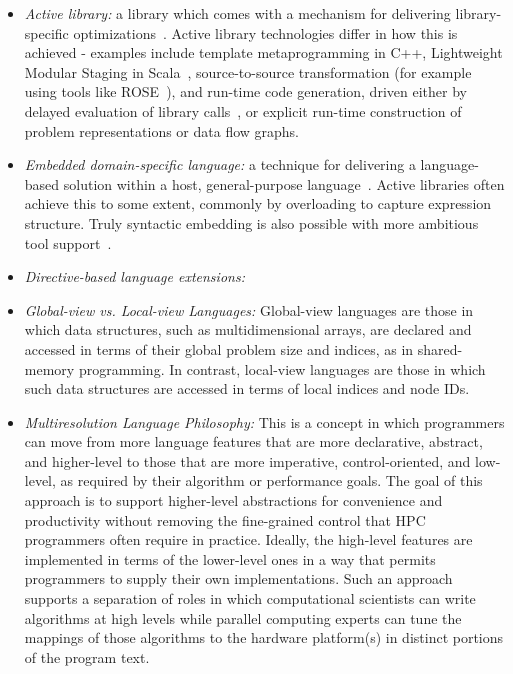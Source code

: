 \begin{itemize}
\item \emph{Active library:} a library which comes with a mechanism for delivering library-specific optimizations~\cite{DBLP:journals/corr/math-NA-9810022}.  Active library technologies differ in how this is achieved - examples include template metaprogramming in C++, Lightweight Modular Staging in Scala~\cite{DBLP:journals/cacm/RompfO12}, source-to-source transformation (for example using tools like ROSE~\cite{DBLP:conf/lcpc/YiQ04}), and run-time code generation, driven either by delayed evaluation of library calls~\cite{DBLP:journals/scp/RussellMKB11}, or explicit run-time construction of problem representations or data flow graphs.
\item \emph{Embedded domain-specific language:} a technique for delivering a language-based solution within a host, general-purpose language~\cite{Hudak96buildingdomain-specific}.  Active libraries often achieve this to some extent, commonly by overloading to capture expression structure.  Truly syntactic embedding is also possible with more ambitious tool support~\cite{Erdweg:2011:SLS:2076021.2048099}.
\item \emph{Directive-based language extensions:}

\item \emph{Global-view vs. Local-view Languages:} Global-view
  languages are those in which data structures, such as multidimensional
  arrays, are declared and accessed in terms of their global problem
  size and indices, as in shared-memory programming.  In contrast,
  local-view languages are those in which such data structures are
  accessed in terms of local indices and node IDs.

\item \emph{Multiresolution Language Philosophy:} This is a concept
  in which programmers can move from more language features that are
  more declarative, abstract, and higher-level to those that are more
  imperative, control-oriented, and low-level, as required by their
  algorithm or performance goals.  The goal of this approach is to
  support higher-level abstractions for convenience and productivity
  without removing the fine-grained control that HPC programmers often
  require in practice.  Ideally, the high-level features are
  implemented in terms of the lower-level ones in a way that permits
  programmers to supply their own implementations.  Such an approach
  supports a separation of roles in which computational scientists can
  write algorithms at high levels while parallel computing experts can
  tune the mappings of those algorithms to the hardware platform(s) in
  distinct portions of the program text.



\end{itemize}

